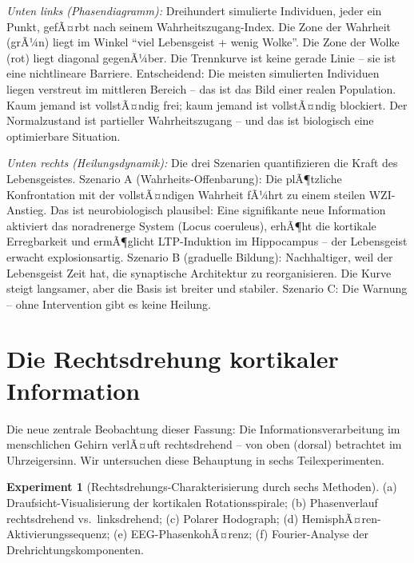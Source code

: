 ﻿\documentclass[12pt,a4paper]{report}
\theoremstyle{plain}
\theoremstyle{definition}
\newtheorem{experiment}[theorem]{Experiment}
\theoremstyle{remark}
\begin{document}
	\textit{Unten links (Phasendiagramm):}
	Dreihundert simulierte Individuen, jeder ein Punkt, gefÃ¤rbt nach
	seinem Wahrheitszugang-Index. Die Zone der Wahrheit (grÃ¼n) liegt im
	Winkel ``viel Lebensgeist + wenig Wolke''. Die Zone der Wolke (rot)
	liegt diagonal gegenÃ¼ber. Die Trennkurve ist keine gerade Linie --
	sie ist eine nichtlineare Barriere.
	Entscheidend: Die meisten simulierten Individuen liegen verstreut im
	mittleren Bereich -- das ist das Bild einer realen Population.
	Kaum jemand ist vollstÃ¤ndig frei; kaum jemand ist vollstÃ¤ndig blockiert.
	Der Normalzustand ist partieller Wahrheitszugang -- und das ist biologisch
	eine optimierbare Situation.

	\textit{Unten rechts (Heilungsdynamik):}
	Die drei Szenarien quantifizieren die Kraft des Lebensgeistes.
	Szenario A (Wahrheits-Offenbarung): Die plÃ¶tzliche Konfrontation mit
	der vollstÃ¤ndigen Wahrheit fÃ¼hrt zu einem steilen WZI-Anstieg.
	Das ist neurobiologisch plausibel: Eine signifikante neue Information
	aktiviert das noradrenerge System (Locus coeruleus), erhÃ¶ht die
	kortikale Erregbarkeit und ermÃ¶glicht LTP-Induktion im Hippocampus --
	der Lebensgeist erwacht explosionsartig.
	Szenario B (graduelle Bildung): Nachhaltiger, weil der Lebensgeist
	Zeit hat, die synaptische Architektur zu reorganisieren. Die Kurve
	steigt langsamer, aber die Basis ist breiter und stabiler.
	Szenario C: Die Warnung -- ohne Intervention gibt es keine Heilung.
	
	\section{Die Rechtsdrehung kortikaler Information}
	
	Die neue zentrale Beobachtung dieser Fassung: Die Informationsverarbeitung
	im menschlichen Gehirn verlÃ¤uft rechtsdrehend -- von oben (dorsal)
	betrachtet im Uhrzeigersinn. Wir untersuchen diese Behauptung in sechs Teilexperimenten.
	
	\begin{experiment}[Rechtsdrehungs-Charakterisierung durch sechs Methoden]
		(a) Drauf\-sicht-Visualisierung der kortikalen Rotationsspirale;
		(b) Phasenverlauf rechtsdrehend vs.\ linksdrehend;
		(c) Polarer Hodograph;
		(d) HemisphÃ¤ren-Aktivierungssequenz;
		(e) EEG-PhasenkohÃ¤renz;
		(f) Fourier-Analyse der Drehrichtungskomponenten.
	\end{experiment}
	
\end{document}
